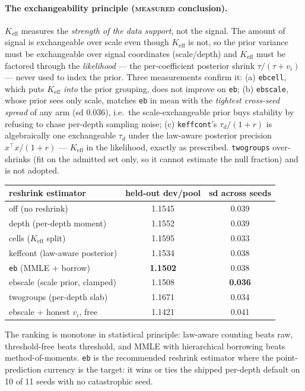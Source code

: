 \paragraph{The exchangeability principle (\textsc{measured} conclusion).}
$K_{\mathrm{eff}}$ measures the \emph{strength of the data support}, not the
signal. The amount of signal is exchangeable over scale even though
$K_{\mathrm{eff}}$ is not, so the prior variance must be exchangeable over
signal coordinates (scale/depth) and $K_{\mathrm{eff}}$ must be factored
through the \emph{likelihood} --- the per-coefficient posterior shrink
$\tau/(\tau+v_i)$ --- never used to index the prior. Three measurements
confirm it: (a) \texttt{ebcell}, which puts $K_{\mathrm{eff}}$ \emph{into} the
prior grouping, does not improve on \texttt{eb}; (b) \texttt{ebscale}, whose
prior sees only scale, matches \texttt{eb} in mean with the \emph{tightest
cross-seed spread} of any arm (sd $0.036$), i.e.\ the scale-exchangeable prior
buys stability by refusing to chase per-depth sampling noise; (c)
\texttt{keffcont}'s $\tau_d/(1+r)$ is algebraically one exchangeable $\tau_d$
under the law-aware posterior precision $x^\top x/(1+r)$ --- $K_{\mathrm{eff}}$
in the likelihood, exactly as prescribed. \texttt{twogroups} over-shrinks
(fit on the admitted set only, so it cannot estimate the null fraction) and is
not adopted.

\begin{center}
\begin{tabular}{lcc}
\hline
reshrink estimator & held-out dev/pool & sd across seeds\\
\hline
off (no reshrink)              & 1.1545 & 0.039\\
depth (per-depth moment)       & 1.1552 & 0.039\\
cells ($K_{\mathrm{eff}}$ split)& 1.1595 & 0.033\\
keffcont (law-aware posterior) & 1.1534 & 0.038\\
\texttt{eb} (MMLE + borrow)    & \textbf{1.1502} & 0.038\\
ebscale (scale prior, clamped) & 1.1508 & \textbf{0.036}\\
twogroups (per-depth slab)     & 1.1671 & 0.034\\
ebscale + honest $v_i$, free   & 1.1421 & 0.041\\
\hline
\end{tabular}
\end{center}

The ranking is monotone in statistical principle: law-aware counting beats raw,
threshold-free beats threshold, and MMLE with hierarchical borrowing beats
method-of-moments. \texttt{eb} is the recommended reshrink estimator where the
point-prediction currency is the target: it wins or ties the shipped
per-depth default on 10 of 11 seeds with no catastrophic seed.

